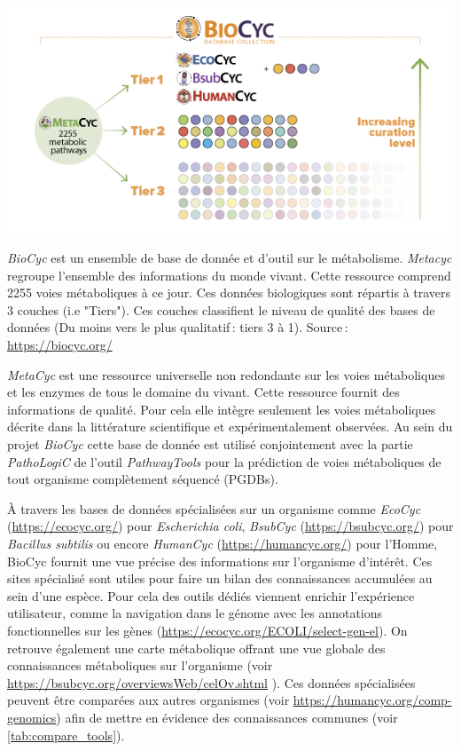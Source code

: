 \begin{refsegment}
    
    \begin{shadedfigure}[H]
    	\centering
    	\includegraphics[width=\textwidth]{img/BioCycCollection.png}
    	\caption{\textit{BioCyc} est un ensemble de base de donnée et d'outil sur le métabolisme. \textit{Metacyc} regroupe l'ensemble des informations du monde vivant. Cette ressource comprend 2255 voies métaboliques à ce jour. Ces données biologiques sont répartis à travers 3 couches (i.e "Tiers"). Ces couches classifient le niveau de qualité des bases de données  (Du moins vers le plus qualitatif : tiers 3 à 1). \hspace{\textwidth} Source : \url{https://biocyc.org/}    }
    	\label{fig:biocyc_collection}
    \end{shadedfigure}
    
    \textit{MetaCyc} \cite{Karp2011,caspi2013metacyc,caspi2016metacyc} est une ressource universelle non redondante sur les voies métaboliques et les enzymes de tous le domaine du vivant. Cette ressource fournit des informations de qualité. Pour cela elle intègre seulement les voies métaboliques décrite dans la littérature scientifique et expérimentalement observées. Au sein du projet \textit{BioCyc} cette base de donnée est utilisé conjointement avec la partie \textit{PathoLogiC} de l'outil \textit{PathwayTools} pour la prédiction de voies métaboliques de tout organisme complètement séquencé (PGDBs).  
    
    À travers les bases de données spécialisées sur un organisme comme \textit{EcoCyc} (\url{https://ecocyc.org/}) pour \textit{Escherichia coli}, \textit{BsubCyc} (\url{https://bsubcyc.org/}) pour \textit{Bacillus subtilis} ou encore \textit{HumanCyc} (\url{https://humancyc.org/}) pour l'Homme, BioCyc fournit une vue précise des informations sur l'organisme d'intérêt. Ces sites spécialisé sont utiles pour faire un bilan des connaissances accumulées au sein d'une espèce. Pour cela des outils dédiés viennent enrichir l'expérience utilisateur, comme la navigation dans le génome avec les annotations fonctionnelles sur les gènes (\url{https://ecocyc.org/ECOLI/select-gen-el}). On retrouve également une carte métabolique offrant une vue globale des connaissances métaboliques sur l'organisme (voir \url{https://bsubcyc.org/overviewsWeb/celOv.shtml} ). Ces données spécialisées peuvent être comparées aux autres organismes  (voir \url{https://humancyc.org/comp-genomics}) afin de mettre en évidence des connaissances communes (voir \cref{tab:compare_tools}).
    

\end{refsegment}
